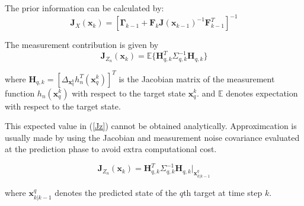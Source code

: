 \documentclass[12pt,journal,draftclsnofoot,onecolumn]{IEEEtran}
\begin{document}
The prior information can be calculated by:
\begin{equation}
    \mathbf{J}_X(\mathbf{x}_k)=[\mathbf{\Gamma}_{k-1}+\mathbf{F}_k\mathbf{J}(\mathbf{x}_{k-1})^{-1}\mathbf{F}_{k-1}^T]^{-1}
    \label{eqn:Jx}
\end{equation}

The measurement contribution is given by
\begin{equation}
    \mathbf{J}_{Z_{n}}(\mathbf{x}_k)=\mathbb{E}\{\mathbf{H}_{q,k}^T\Sigma_{q,k}^{-1}\mathbf{H}_{q,k}\}
    \label{Jz}
\end{equation}

where $\mathbf{H}_{q,k}=[\Delta_{\mathbf{x}_q^k}h_n^T(\mathbf{x}_q^k)]^T$ is the Jacobian matrix of the measurement function $h_n(\mathbf{x}_q^k)$ with respect to the target state $\mathbf{x}_q^k$. and $\mathbb{E}$ denotes expectation with respect to the target state.

This expected value in (\ref{Jz}) cannot be obtained analytically. Approximcation is usually made by using the Jacobian and measurement noise covariance evaluated at the prediction phase to avoid extra computational cost.

\begin{equation}
	\mathbf{J}_{Z_{n}}(\mathbf{x}_k)=\mathbf{H}_{q,k}^T\Sigma_{q,k}^{-1}\mathbf{H}_{q,k}\bigg|_{\mathbf{x}_{k|k-1}^q}	
	\label{eqn:Jz}
\end{equation}

where $\mathbf{x}_{k|k-1}^q$ denotes the predicted state of the $q$th target at time step $k$. 
\end{document}
